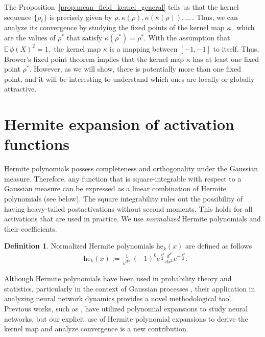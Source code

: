 \documentclass[twoside]{article}
\newcommand{\E}{\mathbb{E}\,}
\newcommand{\he}{\mathrm{he}}
\theoremstyle{definition}
\newtheorem{definition}{Definition}
\begin{document}
The Proposition~\ref{prop:mean_field_kernel_general} tells us that the kernel sequence $\{\rho_\ell\}$ is precisely given by $\rho,\kappa(\rho),\kappa(\kappa(\rho)),\dots\,.$ Thus, we can analyze its convergence by studying the fixed points of the kernel map $\kappa,$
which are the values of $\rho^*$ that satisfy $\kappa(\rho^*) = \rho^*.$  With the assumption that $\E \phi(X)^2=1,$ the kernel map $\kappa$ is a mapping between $[-1,-1]$ to itself. Thus, Brower's fixed point theorem implies that the kernel map $\kappa$ has at least one fixed point $\rho^*.$ However, as we will show, there is potentially more than one fixed point, and it will be interesting to understand which ones are locally or globally attractive. 


\section{Hermite expansion of activation functions}
Hermite polynomials possess completeness and orthogonality under the Gaussian measure. Therefore, any function that is square-integrable with respect to a Gaussian measure can be expressed as a linear combination of Hermite polynomials (see below). The square integrability rules out the possibility of having heavy-tailed postactivations without second moments. This holds for all activations that are used in practice. We use \emph{normalized} Hermite polynomials and their coefficients. 

\begin{definition}
Normalized Hermite polynomials $\he_k(x)$ are defined as follows
\begin{align*}
&\he_k(x) :=\frac{1}{\sqrt{k!}}(-1)^k e^{\frac{x^2}{2}} \frac{d^k}{dx^k} e^{-\frac{x^2}{2}}.
\end{align*}
\end{definition}

Although Hermite polynomials have been used in probability theory and statistics, particularly in the context of Gaussian processes \citep{williams2006gaussian}, their application in analyzing neural network dynamics provides a novel methodological tool. Previous works, such as \citet{daniely2016toward}, have utilized polynomial expansions to study neural networks, but our explicit use of Hermite polynomial expansions to derive the kernel map and analyze convergence is a new contribution.
\end{document}
